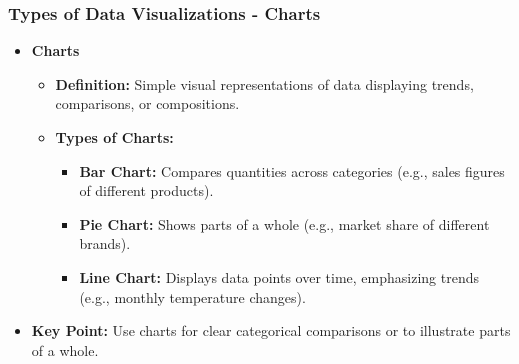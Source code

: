 \documentclass{beamer}
\begin{document}
\begin{frame}[fragile]
    \frametitle{Types of Data Visualizations - Charts}
    \begin{itemize}
        \item \textbf{Charts}
        \begin{itemize}
            \item \textbf{Definition:} Simple visual representations of data displaying trends, comparisons, or compositions.
            \item \textbf{Types of Charts:}
            \begin{itemize}
                \item \textbf{Bar Chart:} Compares quantities across categories (e.g., sales figures of different products).
                \item \textbf{Pie Chart:} Shows parts of a whole (e.g., market share of different brands).
                \item \textbf{Line Chart:} Displays data points over time, emphasizing trends (e.g., monthly temperature changes).
            \end{itemize}
        \end{itemize}
        \item \textbf{Key Point:} Use charts for clear categorical comparisons or to illustrate parts of a whole.
    \end{itemize}
\end{frame}
\end{document}
